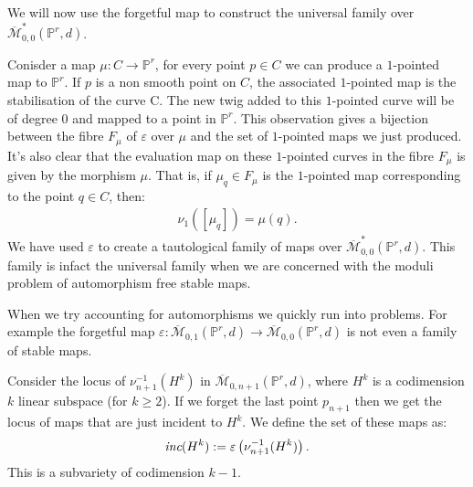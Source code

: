 \begin{example}
\par We will now use the forgetful map to construct the universal family over $\overline{\mathcal{M}}^{*}_{0,0}(\mathbb{P}^{r},d)$.
\par Conisder a map $\mu : C \to \mathbb{P}^{r}$, for every point $p \in C$ we can produce a $1$-pointed map to $\mathbb{P}^{r}$.
If $p$ is a non smooth point on $C$, the associated $1$-pointed map is the stabilisation of the curve C.
The new twig added to this $1$-pointed curve will be of degree $0$ and mapped to a point in $\mathbb{P}^{r}$. 
This observation gives a bijection between the fibre $F_{\mu}$ of $\varepsilon$ over $\mu$ and the set of $1$-pointed maps we just produced. 
It's also clear that the evaluation map on these $1$-pointed curves in the fibre $F_{\mu}$ is given by the morphism $\mu$.
That is, if $\mu_{q} \in F_{\mu}$ is the $1$-pointed map corresponding to the point $q \in C$, then:
\begin{align*}
    \nu_{1}([\mu_{q}]) = \mu (q).
\end{align*}
We have used $\varepsilon$ to create a tautological family of maps over $\overline{\mathcal{M}}^{*}_{0,0}(\mathbb{P}^{r},d)$.
This family is infact the universal family when we are concerned with the moduli problem of automorphism free stable maps.
\end{example}

\begin{remark}
    When we try accounting for automorphisms we quickly run into problems. 
    For example the forgetful map $\varepsilon: \overline{\mathcal{M}}_{0,1}(\mathbb{P}^{r},d) \to \overline{\mathcal{M}}_{0,0}(\mathbb{P}^{r},d)$ is not even a family of stable maps.
\end{remark}

\begin{definition}
    Consider the locus of $\nu_{n+1}^{-1}(H^{k})$ in $\overline{\mathcal{M}}_{0,n+1}(\mathbb{P}^{r},d)$, where $H^{k}$ is a codimension $k$ linear subspace (for $k\geq 2$).
    If we forget the last point $p_{n+1}$ then we get the locus of maps that are just incident to $H^{k}$.
    We define the set of these maps as:
    \begin{align*}
        \emph{inc}(H^{k}) := \varepsilon\left({\nu^{-1}_{n+1}(H^{k})}\right).
    \end{align*}
    This is a subvariety of codimension $k-1$.
\end{definition}

